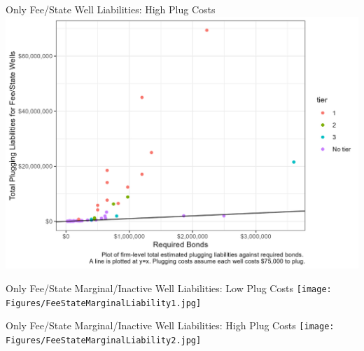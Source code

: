 \documentclass{beamer}
\begin{document}
\begin{frame}{Only Fee/State Well Liabilities: High Plug Costs}
\includegraphics[width=0.8\linewidth]{Figures/FeeStateLiability2.jpg}
\end{frame}

\begin{frame}{Only Fee/State Marginal/Inactive Well Liabilities: Low Plug Costs}
\vspace{-0.6cm}
\texttt{[image: Figures/FeeStateMarginalLiability1.jpg]}
\end{frame}

\begin{frame}{Only Fee/State Marginal/Inactive Well Liabilities: High Plug Costs}
\vspace{-0.6cm}
\texttt{[image: Figures/FeeStateMarginalLiability2.jpg]}
\end{frame}
\end{document}
